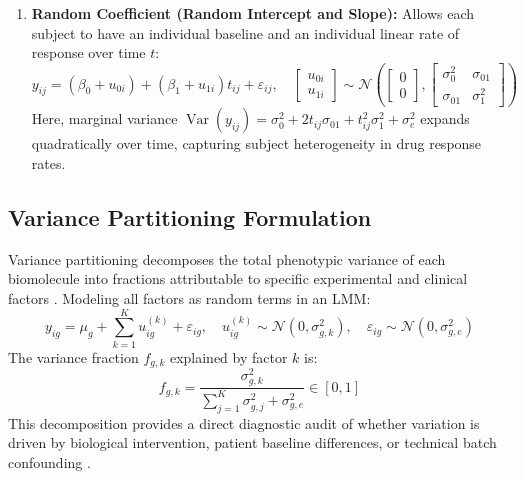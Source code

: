 \documentclass[11pt,twoside,openright]{book}
\begin{document}
\begin{enumerate}
    \item \textbf{Random Coefficient (Random Intercept and Slope):}
    Allows each subject to have an individual baseline and an individual linear rate of response over time $t$:
    \begin{equation}
    \label{eq:random_slope}
    y_{ij} = (\beta_0 + u_{0i}) + (\beta_1 + u_{1i}) t_{ij} + \varepsilon_{ij}, \quad \begin{bmatrix} u_{0i} \\ u_{1i} \end{bmatrix} \sim \mathcal{N}\left( \begin{bmatrix} 0 \\ 0 \end{bmatrix}, \begin{bmatrix} \sigma_0^2 & \sigma_{01} \\ \sigma_{01} & \sigma_1^2 \end{bmatrix} \right)
    \end{equation}
    Here, marginal variance $\operatorname{Var}(y_{ij}) = \sigma_0^2 + 2 t_{ij} \sigma_{01} + t_{ij}^2 \sigma_1^2 + \sigma_e^2$ expands quadratically over time, capturing subject heterogeneity in drug response rates.
\end{enumerate}

\subsection{Variance Partitioning Formulation}

Variance partitioning decomposes the total phenotypic variance of each biomolecule into fractions attributable to specific experimental and clinical factors \cite{hoffman2016variancepartition}. Modeling all factors as random terms in an LMM:
\begin{equation}
\label{eq:varpart_model}
y_{ig} = \mu_g + \sum_{k=1}^K u_{ig}^{(k)} + \varepsilon_{ig}, \quad u_{ig}^{(k)} \sim \mathcal{N}(0, \sigma_{g, k}^2), \quad \varepsilon_{ig} \sim \mathcal{N}(0, \sigma_{g, e}^2)
\end{equation}
The variance fraction $f_{g, k}$ explained by factor $k$ is:
\begin{equation}
\label{eq:varpart_fraction}
f_{g, k} = \frac{\sigma_{g, k}^2}{\sum_{j=1}^K \sigma_{g, j}^2 + \sigma_{g, e}^2} \in [0, 1]
\end{equation}
This decomposition provides a direct diagnostic audit of whether variation is driven by biological intervention, patient baseline differences, or technical batch confounding \cite{hoffman2016variancepartition}.
\end{document}
